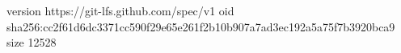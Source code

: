 version https://git-lfs.github.com/spec/v1
oid sha256:cc2f61d6dc3371cc590f29e65e261f2b10b907a7ad3ec192a5a75f7b3920bca9
size 12528
